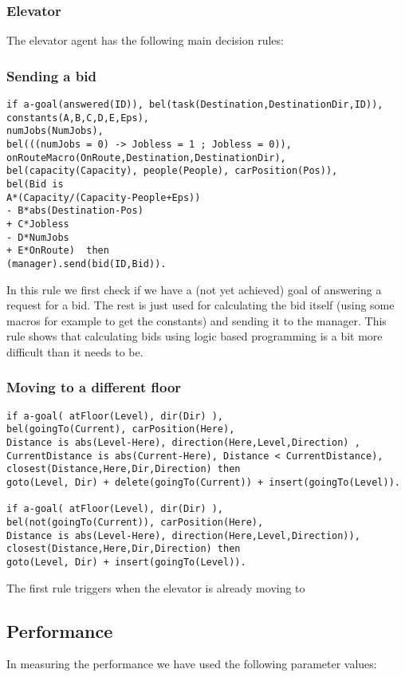 \documentclass[a4paper,11pt]{article}
\begin{document}
\subsubsection{Elevator}
The elevator agent has the following main decision rules:

\subsubsection*{Sending a bid}
\begin{verbatim}
if a-goal(answered(ID)), bel(task(Destination,DestinationDir,ID)),
constants(A,B,C,D,E,Eps),
numJobs(NumJobs),		
bel(((numJobs = 0) -> Jobless = 1 ; Jobless = 0)),
onRouteMacro(OnRoute,Destination,DestinationDir),
bel(capacity(Capacity), people(People), carPosition(Pos)),
bel(Bid is 
A*(Capacity/(Capacity-People+Eps)) 
- B*abs(Destination-Pos)
+ C*Jobless
- D*NumJobs
+ E*OnRoute)  then
(manager).send(bid(ID,Bid)).
\end{verbatim}

In this rule we first check if we have a (not yet achieved) goal of answering a request for a bid. The rest is just used for calculating the bid itself (using some macros for example to get the constants) and sending it to the manager. This rule shows that calculating bids using logic based programming is a bit more difficult than it needs to be.

\subsubsection*{Moving to a different floor}
\begin{verbatim}
if a-goal( atFloor(Level), dir(Dir) ),
bel(goingTo(Current), carPosition(Here), 
Distance is abs(Level-Here), direction(Here,Level,Direction) , 
CurrentDistance is abs(Current-Here), Distance < CurrentDistance),
closest(Distance,Here,Dir,Direction) then 
goto(Level, Dir) + delete(goingTo(Current)) + insert(goingTo(Level)).

if a-goal( atFloor(Level), dir(Dir) ),
bel(not(goingTo(Current)), carPosition(Here), 
Distance is abs(Level-Here), direction(Here,Level,Direction)),
closest(Distance,Here,Dir,Direction) then
goto(Level, Dir) + insert(goingTo(Level)).
\end{verbatim}

The first rule triggers when the elevator is already moving to 
\subsection{Performance}
In measuring the performance we have used the following parameter values:
\end{document}
